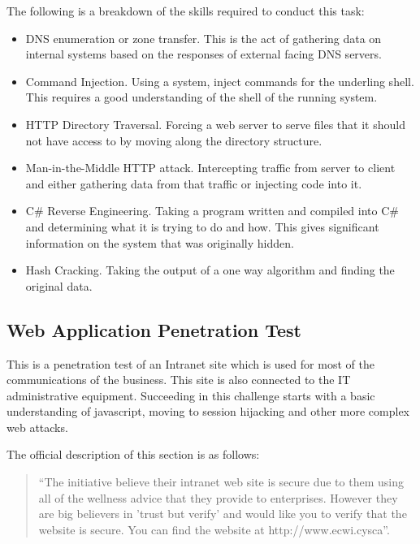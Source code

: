 \documentclass[a4paper,11pt]{report}
\begin{document}
			The following is a breakdown of the skills required to conduct this task:
			\begin{itemize}
				\item DNS enumeration or zone transfer.
					This is the act of gathering data on internal systems based on the responses of external facing DNS servers. 
				\item Command Injection.
					Using a system, inject commands for the underling shell. 
					This requires a good understanding of the shell of the running system. 
				\item HTTP Directory Traversal. 
					Forcing a web server to serve files that it should not have access to by moving along the directory structure.
				\item Man-in-the-Middle HTTP attack.
					Intercepting traffic from server to client and either gathering data from that traffic or injecting code into it. 
				\item C\# Reverse Engineering.
					Taking a program written and compiled into C\# and determining what it is trying to do and how. 
					This gives significant information on the system that was originally hidden. 
				\item Hash Cracking. 
					Taking the output of a one way algorithm and finding the original data. 
			\end{itemize}
		\subsection{Web Application Penetration Test}
			This is a penetration test of an Intranet site which is used for most of the communications of the business. 
			This site is also connected to the IT administrative equipment. 
			Succeeding in this challenge starts with a basic understanding of javascript, moving to session hijacking and other more complex web attacks. 
			
			The official description of this section is as follows:
			\begin{quote}
				``The initiative believe their intranet web site is secure due to them using all of the wellness advice that they provide to enterprises. However they are big believers in 'trust but verify' and would like you to verify that the website is secure. You can find the website at http://www.ecwi.cysca''. 
			\end{quote}
\end{document}
